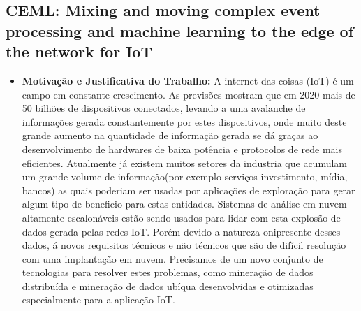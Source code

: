 \documentclass[tid,table]{texufpel} %
\begin{document}
\subsection{CEML: Mixing and moving complex event processing and machine learning to the edge of the network for IoT}

\begin{itemize}
	\item \textbf{Motivação e Justificativa do Trabalho:} A internet das coisas (IoT) é um campo em constante crescimento. As previsões mostram que em 2020 mais de 50 bilhões de dispositivos conectados, levando a uma avalanche de informações gerada constantemente por estes dispositivos, onde muito deste grande aumento na quantidade de informação gerada se dá graças ao desenvolvimento de hardwares de baixa potência e protocolos de rede mais eficientes. Atualmente já existem muitos setores da industria que acumulam um grande volume de informação(por exemplo serviços investimento, mídia, bancos) as quais poderiam ser usadas por aplicações de exploração para gerar algum tipo de beneficio para estas entidades. Sistemas de análise em nuvem altamente escalonáveis estão sendo usados para lidar com esta explosão de dados gerada pelas redes IoT. Porém devido a natureza onipresente desses dados, á novos requisitos técnicos e não técnicos que são de difícil resolução com uma implantação em nuvem. Precisamos de um novo conjunto de tecnologias para resolver estes problemas, como mineração de dados distribuída e mineração de dados ubíqua desenvolvidas e otimizadas especialmente para a aplicação IoT.
	

\end{itemize}
\end{document}
